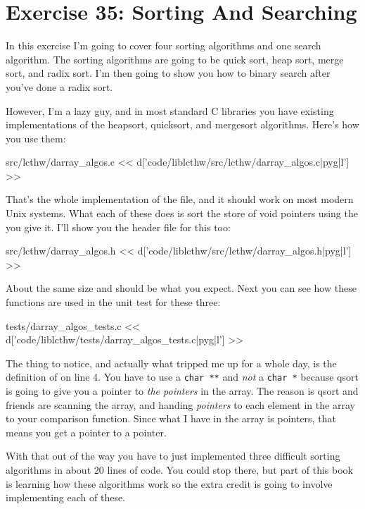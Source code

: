 \chapter{Exercise 35: Sorting And Searching}

In this exercise I'm going to cover four sorting algorithms and one
search algorithm.  The sorting algorithms are going to be quick sort,
heap sort, merge sort, and radix sort.  I'm then going to show you
how to binary search after you've done a radix sort.

However, I'm a lazy guy, and in most standard C libraries you have existing
implementations of the heapsort, quicksort, and mergesort algorithms.  Here's
how you use them:

\begin{code}{src/lcthw/darray\_algos.c}
<< d['code/liblcthw/src/lcthw/darray_algos.c|pyg|l'] >>
\end{code}

That's the whole implementation of the  file, and it
should work on most modern Unix systems.  What each of these does is sort the
 store of void pointers using the  you
give it.  I'll show you the header file for this too:

\begin{code}{src/lcthw/darray\_algos.h}
<< d['code/liblcthw/src/lcthw/darray_algos.h|pyg|l'] >>
\end{code}

About the same size and should be what you expect.  Next you can see how these
functions are used in the unit test for these three:

\begin{code}{tests/darray\_algos\_tests.c}
<< d['code/liblcthw/tests/darray_algos_tests.c|pyg|l'] >>
\end{code}

The thing to notice, and actually what tripped me up for a whole day, is
the definition of  on line 4.  You have to use a \verb|char **|
and \emph{not} a \verb|char *| because qsort is going to give you a pointer
to \emph{the pointers} in the  array.  The reason is qsort
and friends are scanning the array, and handing \emph{pointers} to each element
in the array to your comparison function.  Since what I have in the 
array is pointers, that means you get a pointer to a pointer.

With that out of the way you have to just implemented three difficult 
sorting algorithms in about 20 lines of code.  You could stop there,
but part of this book is learning how these algorithms work so the
extra credit is going to involve implementing each of these.


